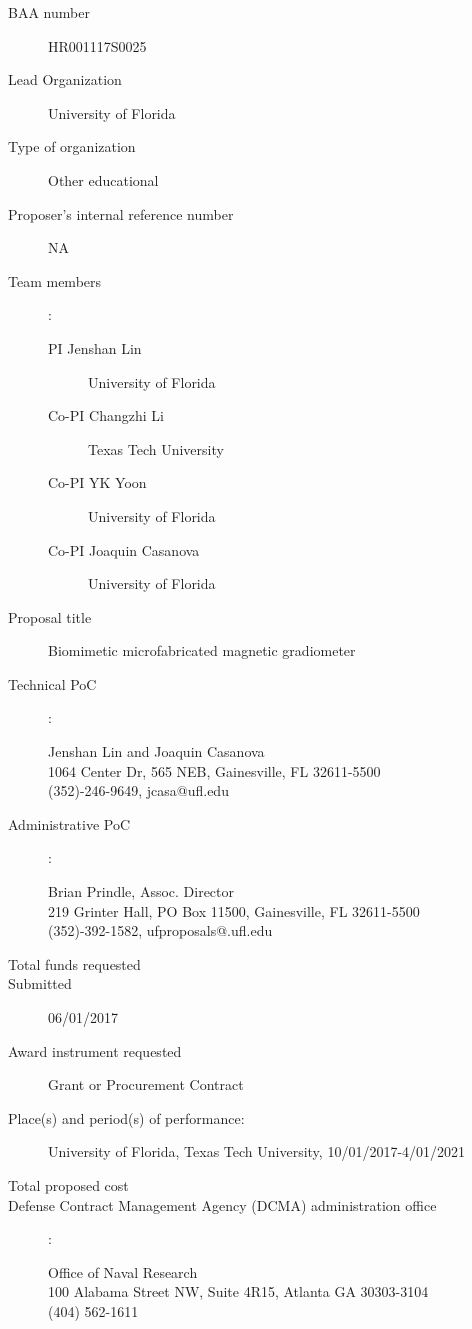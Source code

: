 \begin{description}
\item [BAA number] HR001117S0025
\item [Lead Organization] University of Florida
\item [Type of organization] Other educational
\item [Proposer’s internal reference number] NA
\item [Team members]:
  \begin{description}
  \item [PI Jenshan Lin] University of Florida 
  \item [Co-PI Changzhi Li] Texas Tech University
  \item [Co-PI YK Yoon] University of Florida 
  \item [Co-PI Joaquin Casanova] University of Florida 
  \end{description}
\item [Proposal title] Biomimetic microfabricated magnetic gradiometer
\item [Technical PoC]:
  \begin{description}
  \item [Jenshan Lin and Joaquin Casanova]
  \item [1064 Center Dr, 565 NEB, Gainesville, FL 32611-5500]
  \item [(352)-246-9649, jcasa@ufl.edu]
  \end{description}
\item [Administrative PoC]:
  \begin{description}
  \item [Brian Prindle, Assoc. Director]
  \item [219 Grinter Hall, PO Box 11500, Gainesville, FL 32611-5500]
  \item [(352)-392-1582, ufproposals@.ufl.edu]
  \end{description}
\item [Total funds requested]
\item [Submitted] 06/01/2017
\item [Award instrument requested] Grant or Procurement Contract
\item [Place(s) and period(s) of performance:] University of Florida, Texas Tech University, 10/01/2017-4/01/2021
\item [Total proposed cost]
\item [Defense Contract Management Agency (DCMA) administration office]:
  \begin{description}
  \item [Office of Naval Research]
  \item [100 Alabama Street NW, Suite 4R15, Atlanta GA 30303-3104]
  \item [(404) 562-1611]
  \end{description}


\end{description}
